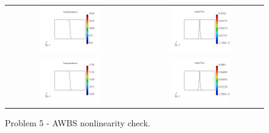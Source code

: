 \documentclass[review]{elsarticle}
\begin{document}
\begin{figure}[tbh]
  \begin{center}
    \begin{tabular}{cc}
      \includegraphics[width=0.5\textwidth]{figs/temperature_p51DT1000.png} &
      \includegraphics[width=0.5\textwidth]{figs/hflux_p51DT1000.png} \\
      \includegraphics[width=0.5\textwidth]{figs/temperature_p51DT1100.png} &
      \includegraphics[width=0.5\textwidth]{figs/hflux_p51DT1100.png}
    \end{tabular}
  \caption{
    Problem 5 - AWBS nonlinearity check.
  }
  \end{center}
  \label{fig:p51D_AWBS_nonlinearity}
\end{figure}
\clearpage
\end{document}
